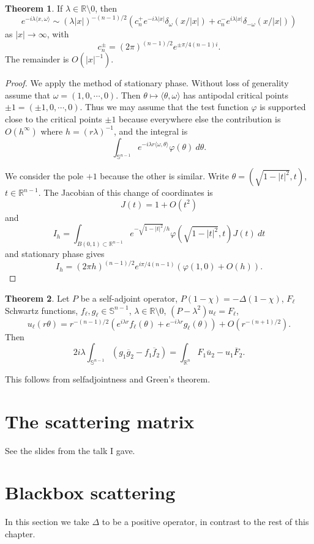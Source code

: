\documentclass[12pt]{report}
\newcommand{\RR}{\mathbb{R}}
\newcommand{\Sphere}{\mathbb S}
\theoremstyle{definition}
\newtheorem{theorem}{Theorem}[chapter]
\begin{document}
\begin{theorem}
If $\lambda \in \RR \setminus 0$, then
$$e^{-i\lambda\langle x,\omega\rangle}\sim (\lambda|x|)^{-(n-1)/2}(c_n^+ e^{-i\lambda|x|}\delta_\omega(x/|x|) + c_n^- e^{i\lambda|x|}\delta_{-\omega}(x/|x|) )$$
as $|x| \to \infty$, with
$$c_n^\pm = (2\pi)^{(n-1)/2}e^{\pm \pi/4(n-1)i}.$$
The remainder is $O(|x|^{-1})$.
\end{theorem}
\begin{proof}
We apply the method of stationary phase.
Without loss of generality assume that $\omega = (1, 0, \cdots, 0)$. Then $\theta \mapsto \langle \theta, \omega\rangle$ has antipodal critical points $\pm 1 = (\pm 1, 0, \cdots, 0)$.
Thus we may assume that the test function $\varphi$ is supported close to the critical points $\pm 1$ because everywhere else the contribution is $O(h^\infty)$ where $h = (r\lambda)^{-1}$, and the integral is
$$\int_{\Sphere^{n-1}} e^{-i\lambda r\langle \omega,\theta\rangle} \varphi(\theta)~d\theta.$$

We consider the pole $+1$ because the other is similar. Write $\theta = (\sqrt{1 - |t|^2}, t)$, $t \in \RR^{n-1}$.
The Jacobian of this change of coordinates is
$$J(t) = 1 + O(t^2)$$
and
$$I_h = \int_{B(0, 1) \subset \RR^{n-1}} e^{-\sqrt{1 - |t|^2}/h} \varphi(\sqrt{1 - |t|^2}, t)J(t)~dt$$
and stationary phase gives
$$I_h = (2\pi h)^{(n-1)/2}e^{i\pi/4(n-1)}(\varphi(1, 0) + O(h)).$$
\end{proof}

\begin{theorem}
Let $P$ be a self-adjoint operator, $P(1 - \chi) = -\Delta(1 - \chi)$, $F_\ell$ Schwartz functions, $f_\ell, g_\ell \in \Sphere^{n-1}$, $\lambda \in \RR \setminus 0$, $(P - \lambda^2)u_\ell = F_\ell$,
$$u_\ell(r\theta) = r^{-(n-1)/2}(e^{i\lambda r}f_\ell(\theta) + e^{-i\lambda r}g_\ell(\theta)) + O(r^{-(n+1)/2}).$$
Then
$$2i\lambda\int_{\Sphere^{n-1}}(g_1\overline g_2 - f_1\overline f_2) = \int_{\RR^n} F_1\overline u_2 - u_1\overline F_2.$$
\end{theorem}
This follows from selfadjointness and Green's theorem.

\section{The scattering matrix}
See the slides from the talk I gave.

\section{Blackbox scattering}
In this section we take $\Delta$ to be a positive operator, in contrast to the rest of this chapter.
\end{document}
